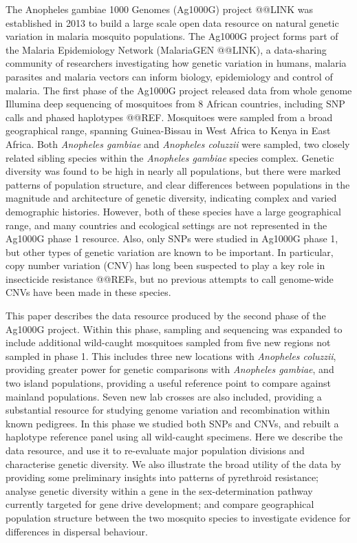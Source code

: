 \documentclass[a4paper,11pt,abstracton,hidelinks]{scrartcl}
\begin{document}
%
The Anopheles gambiae 1000 Genomes (Ag1000G) project @@LINK was established in 2013 to build a large scale open data resource on natural genetic variation in malaria mosquito populations.
%
The Ag1000G project forms part of the Malaria Epidemiology Network (MalariaGEN @@LINK), a data-sharing community of researchers investigating how genetic variation in humans, malaria parasites and malaria vectors can inform biology, epidemiology and control of malaria.
%
The first phase of the Ag1000G project released data from whole genome Illumina deep sequencing of mosquitoes from 8 African countries, including SNP calls and phased haplotypes @@REF.
%
Mosquitoes were sampled from a broad geographical range, spanning Guinea-Bissau in West Africa to Kenya in East Africa.
%
Both \textit{Anopheles gambiae} and \textit{Anopheles coluzzii} were sampled, two closely related sibling species within the \textit{Anopheles gambiae} species complex.
%
Genetic diversity was found to be high in nearly all populations, but there were marked patterns of population structure, and clear differences between populations in the magnitude and architecture of genetic diversity, indicating complex and varied demographic histories.
%
However, both of these species have a large geographical range, and many countries and ecological settings are not represented in the Ag1000G phase 1 resource.
%
Also, only SNPs were studied in Ag1000G phase 1, but other types of genetic variation are known to be important.
%
In particular, copy number variation (CNV) has long been suspected to play a key role in insecticide resistance @@REFs, but no previous attempts to call genome-wide CNVs have been made in these species.


%
This paper describes the data resource produced by the second phase of the Ag1000G project.
%
Within this phase, sampling and sequencing was expanded to include additional wild-caught mosquitoes sampled from five new regions not sampled in phase 1.
%
This includes three new locations with \textit{Anopheles coluzzii}, providing greater power for genetic comparisons with \textit{Anopheles gambiae}, and two island populations, providing a useful reference point to compare against mainland populations.
%
Seven new lab crosses are also included, providing a substantial resource for studying genome variation and recombination within known pedigrees.
%
In this phase we studied both SNPs and CNVs, and rebuilt a haplotype reference panel using all wild-caught specimens.
%
Here we describe the data resource, and use it to re-evaluate major population divisions and characterise genetic diversity.
%
We also illustrate the broad utility of the data by providing some preliminary insights into patterns of pyrethroid resistance; analyse genetic diversity within a gene in the sex-determination pathway currently targeted for gene drive development; and compare geographical population structure between the two mosquito species to investigate evidence for differences in dispersal behaviour.
\end{document}
